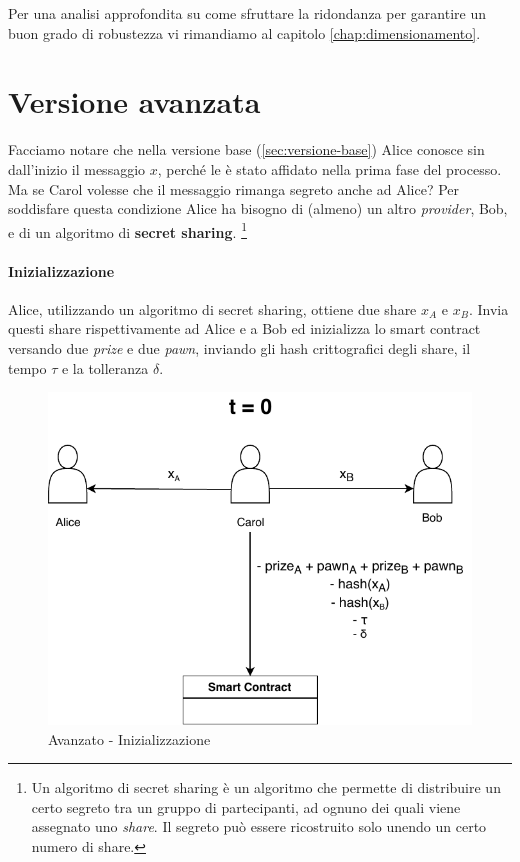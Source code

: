 Per una analisi approfondita su come sfruttare la ridondanza per 
garantire un buon grado di robustezza vi rimandiamo al capitolo
\ref{chap:dimensionamento}.



\section{Versione avanzata}
Facciamo notare che nella versione base (\ref{sec:versione-base})
Alice conosce sin
dall'inizio il messaggio
$ x $, perché le è stato affidato nella prima fase del processo.
Ma se Carol volesse che il messaggio rimanga segreto anche ad Alice?
Per soddisfare questa condizione Alice ha bisogno di (almeno) un altro \textit{provider},
Bob, e di un
algoritmo di \textbf{secret sharing}. \footnote{Un algoritmo di secret sharing
	è un algoritmo che permette di
	distribuire un certo segreto tra un gruppo di partecipanti, ad ognuno dei quali viene
	assegnato uno \textit{share}. Il segreto può essere ricostruito solo unendo un certo
	numero di share.}

\paragraph{Inizializzazione}
Alice, utilizzando un algoritmo di secret sharing, ottiene due share
$ x_A $ e $ x_B $. Invia questi share rispettivamente ad Alice e a Bob ed inizializza
lo smart contract versando due \textit{prize} e due \textit{pawn},
inviando gli hash crittografici
degli share, il tempo $ \tau $ e la tolleranza $ \delta $.
\begin{figure}[H]
	\centering
	\includegraphics[width=0.6\linewidth]{images/chap_protocollo/avanzato-creazione.pdf}
	\caption{Avanzato - Inizializzazione}
\end{figure}



